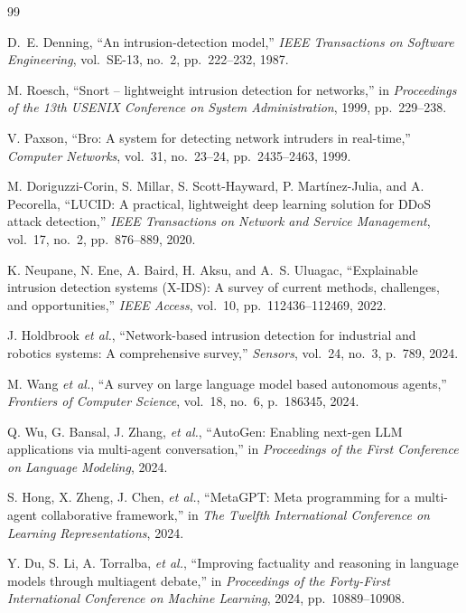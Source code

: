 \documentclass[pdflatex,sn-mathphys-num]{sn-jnl}
\begin{document}
\begin{thebibliography}{99}

D.~E. Denning, ``An intrusion-detection model,'' \emph{IEEE Transactions on Software Engineering}, vol.~SE-13, no.~2, pp.~222--232, 1987.

M. Roesch, ``Snort -- lightweight intrusion detection for networks,'' in \emph{Proceedings of the 13th USENIX Conference on System Administration}, 1999, pp.~229--238.

V. Paxson, ``Bro: A system for detecting network intruders in real-time,'' \emph{Computer Networks}, vol.~31, no.~23--24, pp.~2435--2463, 1999.

M. Doriguzzi-Corin, S. Millar, S. Scott-Hayward, P. Mart{\'i}nez-Julia, and A. Pecorella, ``LUCID: A practical, lightweight deep learning solution for DDoS attack detection,'' \emph{IEEE Transactions on Network and Service Management}, vol.~17, no.~2, pp.~876--889, 2020.

K. Neupane, N. Ene, A. Baird, H. Aksu, and A.~S. Uluagac, ``Explainable intrusion detection systems (X-IDS): A survey of current methods, challenges, and opportunities,'' \emph{IEEE Access}, vol.~10, pp.~112436--112469, 2022.

J. Holdbrook \emph{et al.}, ``Network-based intrusion detection for industrial and robotics systems: A comprehensive survey,'' \emph{Sensors}, vol.~24, no.~3, p.~789, 2024.

M. Wang \emph{et al.}, ``A survey on large language model based autonomous agents,'' \emph{Frontiers of Computer Science}, vol.~18, no.~6, p.~186345, 2024.

Q. Wu, G. Bansal, J. Zhang, \emph{et al.}, ``AutoGen: Enabling next-gen LLM applications via multi-agent conversation,'' in \emph{Proceedings of the First Conference on Language Modeling}, 2024.

S. Hong, X. Zheng, J. Chen, \emph{et al.}, ``MetaGPT: Meta programming for a multi-agent collaborative framework,'' in \emph{The Twelfth International Conference on Learning Representations}, 2024.

Y. Du, S. Li, A. Torralba, \emph{et al.}, ``Improving factuality and reasoning in language models through multiagent debate,'' in \emph{Proceedings of the Forty-First International Conference on Machine Learning}, 2024, pp.~10889--10908.


\end{thebibliography}
\end{document}

